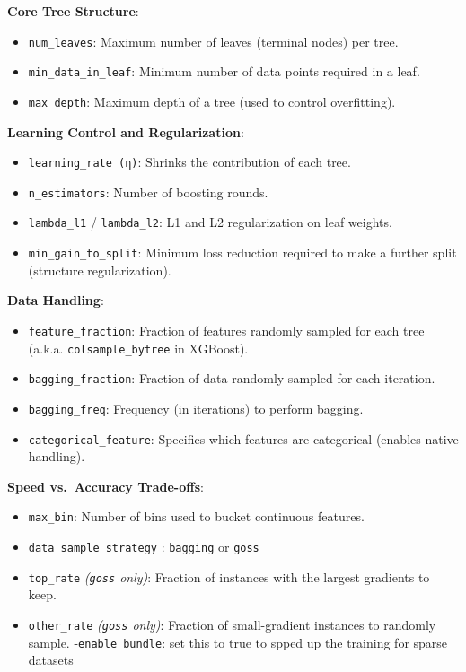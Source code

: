 \documentclass[
  letterpaper,
  DIV=11,
  numbers=noendperiod]{scrreprt}
\providecommand{\tightlist}{%
  \setlength{\itemsep}{0pt}\setlength{\parskip}{0pt}}\usepackage{longtable,booktabs,array}
\begin{document}
\textbf{Core Tree Structure}:

\begin{itemize}
\tightlist
\item
  \texttt{num\_leaves}: Maximum number of leaves (terminal nodes) per
  tree.
\item
  \texttt{min\_data\_in\_leaf}: Minimum number of data points required
  in a leaf.
\item
  \texttt{max\_depth}: Maximum depth of a tree (used to control
  overfitting).
\end{itemize}

\textbf{Learning Control and Regularization}:

\begin{itemize}
\tightlist
\item
  \texttt{learning\_rate\ (η)}: Shrinks the contribution of each tree.
\item
  \texttt{n\_estimators}: Number of boosting rounds.
\item
  \texttt{lambda\_l1} / \texttt{lambda\_l2}: L1 and L2 regularization on
  leaf weights.
\item
  \texttt{min\_gain\_to\_split}: Minimum loss reduction required to make
  a further split (structure regularization).
\end{itemize}

\textbf{Data Handling}:

\begin{itemize}
\tightlist
\item
  \texttt{feature\_fraction}: Fraction of features randomly sampled for
  each tree (a.k.a. \texttt{colsample\_bytree} in XGBoost).
\item
  \texttt{bagging\_fraction}: Fraction of data randomly sampled for each
  iteration.
\item
  \texttt{bagging\_freq}: Frequency (in iterations) to perform bagging.
\item
  \texttt{categorical\_feature}: Specifies which features are
  categorical (enables native handling).
\end{itemize}

\textbf{Speed vs.~Accuracy Trade-offs}:

\begin{itemize}
\tightlist
\item
  \texttt{max\_bin}: Number of bins used to bucket continuous features.
\item
  \texttt{data\_sample\_strategy} : \texttt{bagging} or \texttt{goss}
\item
  \texttt{top\_rate} \emph{(\texttt{goss} only)}: Fraction of instances
  with the largest gradients to keep.
\item
  \texttt{other\_rate} \emph{(\texttt{goss} only)}: Fraction of
  small-gradient instances to randomly sample. -\texttt{enable\_bundle}:
  set this to true to spped up the training for sparse datasets
\end{itemize}
\end{document}
